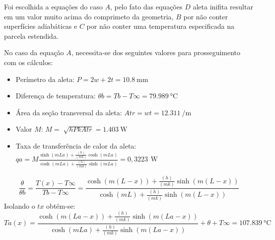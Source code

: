 Foi escolhida a equações do caso \(A\), pelo fato das equações
\(D\) aleta inifita resultar em um valor muito acima do comprimeto da
geometria,
\(B\) por não conter superfícies adiabáticas
e \(C\) por não conter uma temperatura especificada na parcela estendida.
\par No caso da equação \(A\), necessita-se dos seguintes valores
para prosseguimento com os cálculos:
\begin{itemize}[leftmargin=2cm]
    \item Perímetro da aleta: \(
          {P}={2w+2t} = \SI{10,8}{\milli\meter}
          \)
    \item Diferença de temperatura: \(
          {\theta}b={{Tb}-{T\infty}} = \SI{79,989}{\degreeCelsius}
          \)
    \item Área da seção transversal da aleta: \(
          {Atr}={{w}{t}} = \SI{12,311}{\per\meter}
          \)
    \item Valor \(M\): \(
          {M}={\sqrt[]{{h}{P}{k}{Atr}}} = \SI{1,403}{\watt}
          \)
    \item Taxa de transferência
          de calor da aleta: \\\(
          {qa}={M}{
          \frac
          {\sinh{(mLa)}+{\frac{(h)}{(mk)}}{\cosh{(mLa)}}}
          {\cosh{(mLa)}+{\frac{(h)}{(mk)}}{\sinh{(mLa)}}}
          }={0,3223\,\SI{}{\watt}}
          \)
\end{itemize}
\vspace{-1cm}
{\ABNTEXchapterfont\Large\vspace{1cm}{C) Determinar a temperatura na ponta da aleta}}
\begin{equation}
    {\frac{\theta}{{\theta}b}}=
    {\frac
    {T(x)-{T\infty}}
    {Tb-{T\infty}}
    }=
    {
    \frac
    {\cosh{(m(L-x))}+{\frac{(h)}{(mk)}}{\sinh{(m(L-x))}}}
    {\cosh{(mL)}+{\frac{(h)}{(mk)}}{\sinh{(m(L-x))}}}
    }
\end{equation}
Isolando o \(tx\) obtém-se:
\begin{equation}
    {Ta(x)}=
    {
    \frac
    {\cosh{(m(La-x))}+{\frac{(h)}{(mk)}}{\sinh{(m(La-x))}}}
    {\cosh{(mLa)}+{\frac{(h)}{(mk)}}{\sinh{(m(La-x))}}}
    }+
    {\theta}+
    {T\infty}=
    \SI{107,839}{\degreeCelsius}
\end{equation}
\\
